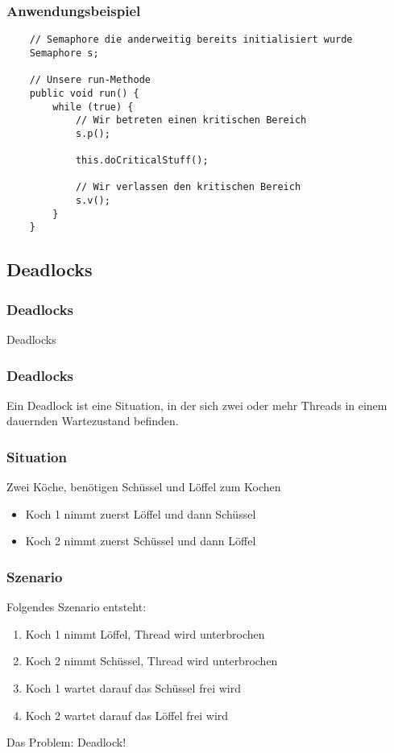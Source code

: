 \begin{frame}[fragile]
	\frametitle{Anwendungsbeispiel}
	\begin{lstlisting}
	// Semaphore die anderweitig bereits initialisiert wurde
	Semaphore s;

	// Unsere run-Methode
	public void run() {
		while (true) {
			// Wir betreten einen kritischen Bereich
			s.p();

			this.doCriticalStuff();

			// Wir verlassen den kritischen Bereich
			s.v();
		}
	}
	\end{lstlisting}
\end{frame}

\subsection{Deadlocks}
\begin{frame}[fragile]
	\frametitle{Deadlocks}
	\huge Deadlocks
\end{frame}

\begin{frame}[fragile]
	\frametitle{Deadlocks}
	Ein Deadlock ist eine Situation, in der sich zwei oder mehr Threads in
	einem dauernden Wartezustand befinden.
\end{frame}

\begin{frame}[fragile]
	\frametitle{Situation}
	Zwei Köche, benötigen Schüssel und Löffel zum Kochen
	\begin{itemize}
	  \item Koch 1 nimmt zuerst Löffel und dann Schüssel
	  \item Koch 2 nimmt zuerst Schüssel und dann Löffel
	\end{itemize}
\end{frame}

\begin{frame}[fragile]
	\frametitle{Szenario}
	\begin{block}{Folgendes Szenario entsteht:}
	\begin{enumerate}
	  \item Koch 1 nimmt Löffel, Thread wird unterbrochen
	  \item Koch 2 nimmt Schüssel, Thread wird unterbrochen
	  \item Koch 1 wartet darauf das Schüssel frei wird
	  \item Koch 2 wartet darauf das Löffel frei wird
	\end{enumerate}
	\end{block}
	\begin{alertblock}{Das Problem:}
	Deadlock!
	\end{alertblock}
\end{frame}

